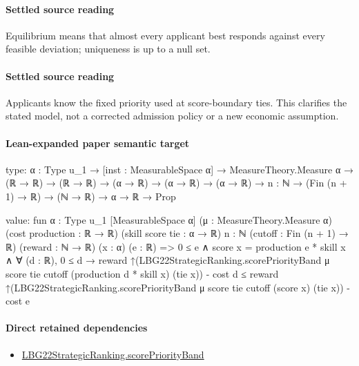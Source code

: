 \documentclass[10pt]{article}
\begin{document}
\paragraph{Settled source reading}
\begin{sloppypar}
Equilibrium means that almost every applicant best responds against every feasible deviation;\allowbreak{} uniqueness is up to a null set.\allowbreak{}
\end{sloppypar}
\paragraph{Settled source reading}
\begin{sloppypar}
Applicants know the fixed priority used at score-\allowbreak{}boundary ties.\allowbreak{} This clarifies the stated model, not a corrected admission policy or a new economic assumption.\allowbreak{}
\end{sloppypar}

\paragraph{Lean-expanded paper semantic target}
\begin{ReviewVerbatim}
type:
{α : Type u_1} →
  [inst : MeasurableSpace α] →
    MeasureTheory.Measure α →
      (ℝ → ℝ) → (ℝ → ℝ) → (α → ℝ) → (α → ℝ) → (α → ℝ) → {n : ℕ} → (Fin (n + 1) → ℝ) → (ℕ → ℝ) → α → ℝ → Prop

value:
fun {α : Type u_1} [MeasurableSpace α] (μ : MeasureTheory.Measure α) (cost production : ℝ → ℝ) (skill score tie : α → ℝ)
    {n : ℕ} (cutoff : Fin (n + 1) → ℝ) (reward : ℕ → ℝ) (x : α) (e : ℝ) =>
  0 ≤ e ∧
    score x = production e * skill x ∧
      ∀ (d : ℝ),
        0 ≤ d →
          reward ↑(LBG22StrategicRanking.scorePriorityBand μ score tie cutoff (production d * skill x) (tie x)) -
              cost d ≤
            reward ↑(LBG22StrategicRanking.scorePriorityBand μ score tie cutoff (score x) (tie x)) - cost e
\end{ReviewVerbatim}

\paragraph{Direct retained dependencies}
\begin{itemize}\raggedright
\item \hyperlink{governing-declaration-29f9270f1ab8f757}{LBG22\allowbreak{}Strategic\allowbreak{}Ranking.\allowbreak{}score\allowbreak{}Priority\allowbreak{}Band}
\end{itemize}
\end{document}
